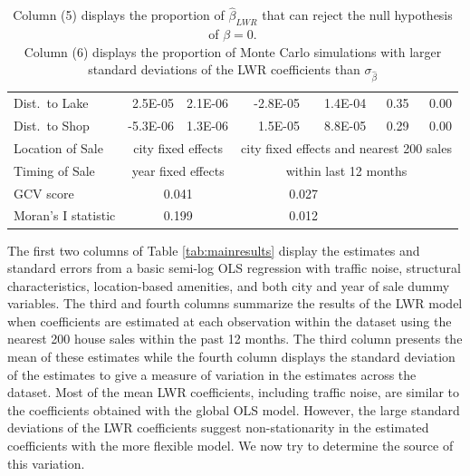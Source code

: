\documentclass{article}\usepackage[]{graphicx}\usepackage[]{color}
\begin{document}
\begin{table}[bp]
{\begin{tabular}{lrrrrrr}
  Dist.\ to Lake & 2.5E-05 & 2.1E-06 & -2.8E-05 & 1.4E-04 & 0.35 & 0.00 \\ 
  Dist.\ to Shop & -5.3E-06 & 1.3E-06 & 1.5E-05 & 8.8E-05 & 0.29 & 0.00 \\  
  Location of Sale & \multicolumn{2}{c}{city fixed effects} & \multicolumn{4}{c}{\footnotesize city fixed effects and nearest 200 sales} \\
  Timing of Sale & \multicolumn{2}{c}{year fixed effects} & \multicolumn{4}{c}{within last 12 months} \\
 \hline
  GCV score & \multicolumn{2}{c}{0.041} & \multicolumn{2}{c}{0.027}  &  & \\
  Moran's I statistic & \multicolumn{2}{c}{0.199} & \multicolumn{2}{c}{0.012} & & \\
\end{tabular}
}
 \caption*{\footnotesize Column (5) displays the proportion of $\hat{\beta}_{LWR}$ that can reject the null hypothesis of $\beta =0$.\\ Column (6) displays the proportion of Monte Carlo simulations with larger standard deviations of the LWR coefficients than $\sigma_{\hat{\beta}}$}
\end{table}

The first two columns of Table \ref{tab:mainresults} display the estimates and standard errors from a basic semi-log OLS regression with traffic noise, structural characteristics, location-based amenities, and both city and year of sale dummy variables. The third and fourth columns summarize the results of the LWR model when coefficients are estimated at each observation within the dataset using the nearest 200 house sales within the past 12 months. The third column presents the mean of these estimates while the fourth column displays the standard deviation of the estimates to give a measure of variation in the estimates across the dataset. Most of the mean LWR coefficients, including traffic noise, are similar to the coefficients obtained with the global OLS model. However, the large standard deviations of the LWR coefficients suggest non-stationarity in the estimated coefficients with the more flexible model. We now try to determine the source of this variation.
\end{document}
